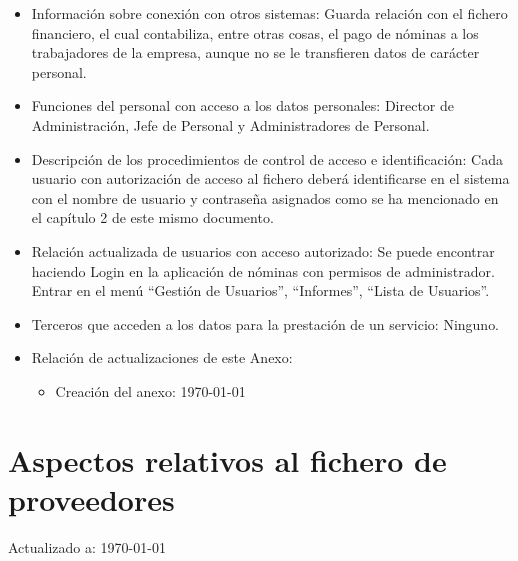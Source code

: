 \documentclass[a4paper,11pt,bibtotoc,noliststotoc]{scrbook}
\begin{document}
\begin{itemize}
\begin{itemize}
\end{itemize}


\item Información sobre conexión con otros sistemas: Guarda relación con el fichero financiero, el cual contabiliza, entre otras cosas, el pago de nóminas a los trabajadores de la empresa, aunque no se le transfieren datos de carácter personal.

\item Funciones del personal con acceso a los datos personales: Director de Administración, Jefe de Personal y Administradores de Personal.

\item Descripción de los procedimientos de control de acceso e identificación: Cada usuario con autorización de acceso al fichero deberá identificarse en el sistema con el nombre de usuario y contraseña asignados como se ha mencionado en el capítulo 2 de este mismo documento.

\item Relación actualizada de usuarios con acceso autorizado: Se puede encontrar haciendo Login en la aplicación de nóminas con permisos de administrador. Entrar en el menú "`Gestión de Usuarios"', "`Informes"', "`Lista de Usuarios"'.

\item Terceros que acceden a los datos para la prestación de un servicio: Ninguno.

\item Relación de actualizaciones de este Anexo:  

	\begin{itemize}
	\item Creación del anexo: \today
	\end{itemize}

\end{itemize}







\section{Aspectos relativos al fichero de proveedores}


Actualizado a: \today
\end{document}
